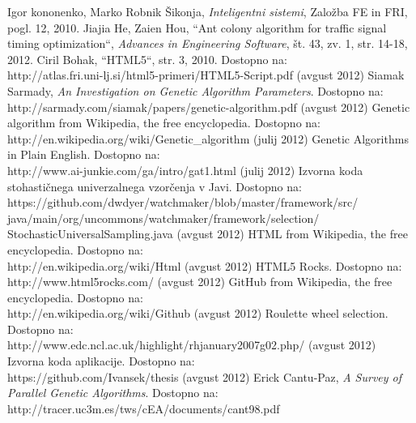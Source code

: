 \documentclass[a4paper, 12pt]{book}
\begin{document}
 
\begin{thebibliography}{99}
 Igor kononenko, Marko Robnik \v Sikonja, \textit{Inteligentni sistemi}, Zalo\v zba FE in FRI, pogl. 12, 2010.
 Jiajia He, Zaien Hou, ``Ant colony algorithm for traffic signal timing optimization``, \textit{Advances in Engineering Software}, \v st. 43, zv. 1, str.  14-18, 2012.
 Ciril Bohak, ``HTML5``, str. 3, 2010. Dostopno na:\\
http://atlas.fri.uni-lj.si/html5-primeri/HTML5-Script.pdf
 (avgust 2012) Siamak Sarmady, \textit{An Investigation on Genetic Algorithm Parameters}. Dostopno na:\\ 
http://sarmady.com/siamak/papers/genetic-algorithm.pdf
 (avgust 2012) Genetic algorithm from Wikipedia, the free encyclopedia. Dostopno na:\\
http://en.wikipedia.org/wiki/Genetic\_algorithm
 (julij 2012) Genetic Algorithms in Plain English. Dostopno na:\\
http://www.ai-junkie.com/ga/intro/gat1.html
 (julij 2012) Izvorna koda stohasti\v cnega univerzalnega vzor\v cenja v Javi. Dostopno na:\\
https://github.com/dwdyer/watchmaker/blob/master/framework/src/\\
java/main/org/uncommons/watchmaker/framework/selection/\\
StochasticUniversalSampling.java
 (avgust 2012) HTML from Wikipedia, the free encyclopedia. Dostopno na:\\
http://en.wikipedia.org/wiki/Html
 (avgust 2012) HTML5 Rocks. Dostopno na:\\
http://www.html5rocks.com/
 (avgust 2012) GitHub from Wikipedia, the free encyclopedia. Dostopno na:\\
http://en.wikipedia.org/wiki/Github
(avgust 2012) Roulette wheel selection. Dostopno na:\\
http://www.edc.ncl.ac.uk/highlight/rhjanuary2007g02.php/
(avgust 2012) Izvorna koda aplikacije. Dostopno na:\\
https://github.com/Ivansek/thesis
(avgust 2012) Erick Cantu-Paz, \textit{A Survey of Parallel Genetic Algorithms}. Dostopno na:\\
http://tracer.uc3m.es/tws/cEA/documents/cant98.pdf
\end{thebibliography}
\end{document}
